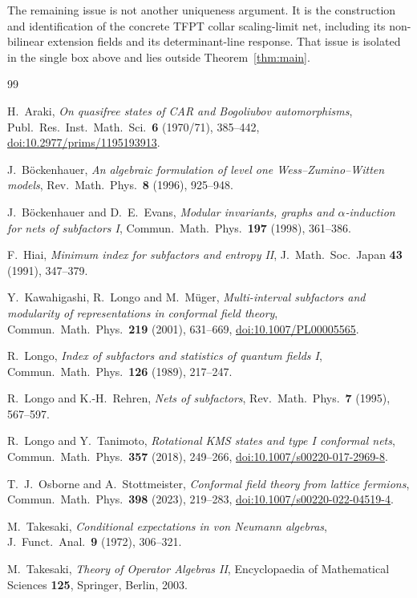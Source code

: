 \documentclass[11pt]{article}
\theoremstyle{remark}
\begin{document}
The remaining issue is not another uniqueness argument.  It is the
construction and identification of the concrete TFPT collar
scaling-limit net, including its non-bilinear extension fields and
its determinant-line response.  That issue is isolated in the
single box above and lies outside Theorem~\ref{thm:main}.

\begin{thebibliography}{99}

H.~Araki,
\emph{On quasifree states of CAR and Bogoliubov automorphisms},
Publ.\ Res.\ Inst.\ Math.\ Sci.\ \textbf{6} (1970/71), 385--442,
\href{https://doi.org/10.2977/prims/1195193913}
{doi:10.2977/prims/1195193913}.

J.~B\"ockenhauer,
\emph{An algebraic formulation of level one Wess--Zumino--Witten
models},
Rev.\ Math.\ Phys.\ \textbf{8} (1996), 925--948.

J.~B\"ockenhauer and D.~E.~Evans,
\emph{Modular invariants, graphs and $\alpha$-induction for nets of
subfactors I},
Commun.\ Math.\ Phys.\ \textbf{197} (1998), 361--386.

F.~Hiai,
\emph{Minimum index for subfactors and entropy II},
J.\ Math.\ Soc.\ Japan \textbf{43} (1991), 347--379.

Y.~Kawahigashi, R.~Longo and M.~M\"uger,
\emph{Multi-interval subfactors and modularity of representations
in conformal field theory},
Commun.\ Math.\ Phys.\ \textbf{219} (2001), 631--669,
\href{https://doi.org/10.1007/PL00005565}
{doi:10.1007/PL00005565}.

R.~Longo,
\emph{Index of subfactors and statistics of quantum fields I},
Commun.\ Math.\ Phys.\ \textbf{126} (1989), 217--247.

R.~Longo and K.-H.~Rehren,
\emph{Nets of subfactors},
Rev.\ Math.\ Phys.\ \textbf{7} (1995), 567--597.

R.~Longo and Y.~Tanimoto,
\emph{Rotational KMS states and type I conformal nets},
Commun.\ Math.\ Phys.\ \textbf{357} (2018), 249--266,
\href{https://doi.org/10.1007/s00220-017-2969-8}
{doi:10.1007/s00220-017-2969-8}.

T.~J.~Osborne and A.~Stottmeister,
\emph{Conformal field theory from lattice fermions},
Commun.\ Math.\ Phys.\ \textbf{398} (2023), 219--283,
\href{https://doi.org/10.1007/s00220-022-04519-4}
{doi:10.1007/s00220-022-04519-4}.

M.~Takesaki,
\emph{Conditional expectations in von Neumann algebras},
J.\ Funct.\ Anal.\ \textbf{9} (1972), 306--321.

M.~Takesaki,
\emph{Theory of Operator Algebras II},
Encyclopaedia of Mathematical Sciences \textbf{125},
Springer, Berlin, 2003.

\end{thebibliography}
\end{document}
